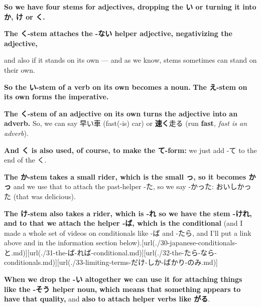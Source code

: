 {\bf So we have four stems for adjectives, dropping the い or turning it into か, け or く.}

\startsectionlevel[title={The く stem},reference={the-く-stem}]

{\bf The く-stem attaches the -ない helper adjective, negativizing the adjective,}

{}

and also if it stands on its own --- and as we know, stems sometimes can stand on their own.

{\bf So the い-stem of a verb on its own becomes a noun.} {\bf The え-stem on its own forms the imperative.}

{\bf The く-stem of an adjective on its own turns the adjective into an adverb.} So, we can say 早い車 (fast(-is) car) or {\bf 速く}走る (run {\bf fast}{\em , fast is an adverb}).

{\bf And く is also used, of course, to make the て-form:} we just add -て to the end of the く.

\stopsectionlevel

\startsectionlevel[title={The か stem (かっ)},reference={the-か-stem-かっ}]

{\bf The か-stem takes a small rider, which is the small っ, so it becomes かっ} and we use that to attach the past-helper -た, so we say -かった: おいしかった (that was delicious).

{}

\stopsectionlevel

\startsectionlevel[title={The け stem (けれ)},reference={the-け-stem-けれ}]

{\bf The け-stem also takes a rider, which is -れ so we have the stem -けれ,} {\bf and to that we attach the helper -ば, which is the conditional} (and I made a whole set of videos on conditionals like -ば and -たら, and I'll put a link above and in the information section below).\goto{{[}30{]}}[url(./30-japanese-conditionals-と.md)]\goto{{[}31{]}}[url(./31-the-ば-れば-conditional.md)]\goto{{[}32{]}}[url(./32-the-たら-なら-conditionals.md)]\goto{{[}33{]}}[url(./33-limiting-terms-だけ-しか-ばかり-のみ.md)]

{}

\stopsectionlevel

\startsectionlevel[title={The zero stem},reference={the-zero-stem}]

{\bf When we drop the -い altogether we can use it for attaching things like the -そう helper noun,} {\bf which means that something appears to have that quality,} and {\bf also to attach helper verbs like がる}.

